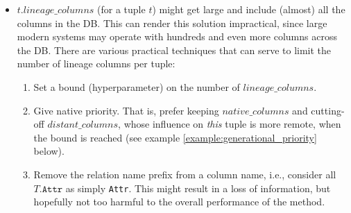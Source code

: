 \begin{itemize}
    \item $t.lineage\_columns$ (for a tuple $t$) might get large and include (almost) all the columns in the DB. This can render this solution impractical, since large modern systems may operate with hundreds and even more columns across the DB. There are various practical techniques that can serve to limit the number of lineage columns per tuple:
    \begin{enumerate}
        \item Set a bound (hyperparameter) on the number of $lineage\_columns$.
        \item Give native priority. That is, prefer keeping $native\_columns$ and cutting-off $distant\_columns$, whose influence on \textit{this} tuple is more remote, when the bound is reached (see example \ref{example:generational_priority} below).
        \item Remove the relation name prefix from a column name, i.e., consider all $T.\texttt{Attr}$ as simply \texttt{Attr}. This might result in a loss of information, but hopefully not too harmful to the overall performance of the method.
    \end{enumerate}
    
\end{itemize}
